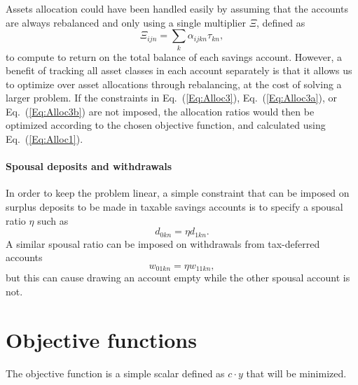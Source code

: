 \documentclass{article}[fleqn,12pt]
\begin{document}
Assets allocation could have been handled easily by assuming that
the accounts are always rebalanced
and only using a single multiplier $\Xi$, defined as
\begin{equation}
	\Xi_{ijn} = \sum_k \alpha_{ijkn}\tau_{kn},
\end{equation}
to compute to return
on the total balance of each savings account.
However, a benefit of tracking all asset classes in each account separately
is that it allows us to optimize over asset allocations through rebalancing, at
the cost of solving a larger problem. If the constraints in Eq.~(\ref{Eq:Alloc3}),
Eq.~(\ref{Eq:Alloc3a}), or Eq.~(\ref{Eq:Alloc3b})
are not imposed, the allocation ratios would then be optimized according to
the chosen objective function, and calculated using Eq.~(\ref{Eq:Alloc1}).

\paragraph*{Spousal deposits and withdrawals}
In order to keep the problem linear, a simple constraint that can be imposed on
surplus deposits to be made in taxable savings accounts is to specify a spousal ratio $\eta$
such as
\begin{equation}
	d_{0kn} = \eta d_{1kn}.
\end{equation}
A similar spousal ratio can be imposed on withdrawals from tax-deferred accounts
\begin{equation}
	w_{01kn} = \eta w_{11kn},
\end{equation}
but this can cause drawing an account empty while the other spousal account is not.

\section{Objective functions}
The objective function is a simple scalar defined as $c\cdot y$ that will be minimized.
\end{document}
